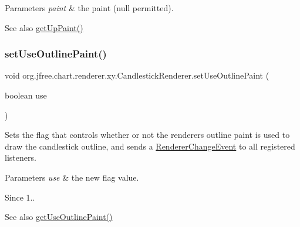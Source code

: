 \begin{DoxyParams}{Parameters}
{\em paint} & the paint ({\ttfamily null} permitted).\\
\hline
\end{DoxyParams}
\begin{DoxySeeAlso}{See also}
\mbox{\hyperlink{classorg_1_1jfree_1_1chart_1_1renderer_1_1xy_1_1_candlestick_renderer_a14f115bf4294f88845d318372e703d0f}{get\+Up\+Paint()}} 
\end{DoxySeeAlso}
\mbox{\label{classorg_1_1jfree_1_1chart_1_1renderer_1_1xy_1_1_candlestick_renderer_a36ef8d46b1f8ff99c0a1172e69e591c0}} 
\subsubsection{\texorpdfstring{set\+Use\+Outline\+Paint()}{setUseOutlinePaint()}}
{\footnotesize\ttfamily void org.\+jfree.\+chart.\+renderer.\+xy.\+Candlestick\+Renderer.\+set\+Use\+Outline\+Paint (\begin{DoxyParamCaption}\item[{boolean}]{use }\end{DoxyParamCaption})}

Sets the flag that controls whether or not the renderer\textquotesingle{}s outline paint is used to draw the candlestick outline, and sends a \mbox{\hyperlink{}{Renderer\+Change\+Event}} to all registered listeners.


\begin{DoxyParams}{Parameters}
{\em use} & the new flag value.\\
\hline
\end{DoxyParams}
\begin{DoxySince}{Since}
1..
\end{DoxySince}
\begin{DoxySeeAlso}{See also}
\mbox{\hyperlink{classorg_1_1jfree_1_1chart_1_1renderer_1_1xy_1_1_candlestick_renderer_af07ad55de5bec4a88d556fa1a76f34fd}{get\+Use\+Outline\+Paint()}} 
\end{DoxySeeAlso}
\mbox{\label{classorg_1_1jfree_1_1chart_1_1renderer_1_1xy_1_1_candlestick_renderer_ae38a9367abdb25199c31357fe5a43f9d}} 
